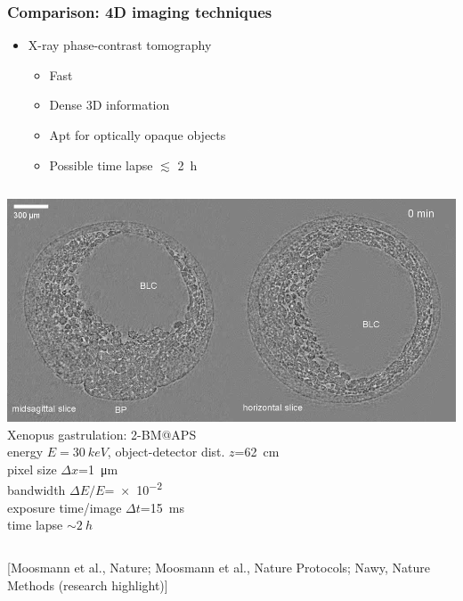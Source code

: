 \documentclass{beamer}
\newcommand{\srefr}[1]{\begin{flushright}{\tiny [#1]}\end{flushright}}
\begin{document}
\begin{frame}
  \frametitle{Comparison: 4D imaging techniques}
    \begin{itemize}
    \item X-ray phase-contrast tomography
      \begin{itemize}
      \item Fast
      \item Dense 3D information
      \item Apt for optically opaque objects
      \item Possible time lapse $\lesssim$ \SI{2}{h}
      \end{itemize}    
    \end{itemize}    
    \begin{columns}[T]
    \href{run:videos/comparison/nature-movie_03.avi?autostart&loop}{
      \includegraphics[width=\textwidth
      ]{videos/comparison/nature-movie_03.jpg}} 
    Xenopus gastrulation:
    {\footnotesize 
      2-BM@APS\\ 
      energy $E=\SI{30}{keV}$,
      object-detector dist. $z$=\SI{62}{cm}\\
      pixel size $\Delta x$=\SI{1}{\micro\metre}\\
      bandwidth $\Delta E/E$=\num{e-2}\\
      exposure time/image $\Delta t$=\SI{15}{ms}\\
      time lapse $\sim\SI{2}{h}$
    }
  \end{columns}
  \srefr{Moosmann et al., Nature;
    Moosmann et al., Nature Protocols;
    Nawy, Nature Methods (research highlight)}
\end{frame}
\end{document}
